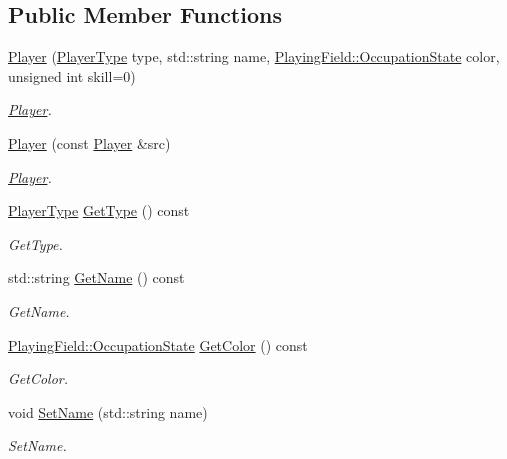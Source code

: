\subsection*{Public Member Functions}
\begin{DoxyCompactItemize}
\item 
\hyperlink{classPlayer_a66f0cbcaa9de5f81fcbb4ee72d0f110e}{Player} (\hyperlink{classPlayer_a97dc3c423902370176605121e8f68415}{Player\-Type} type, std\-::string name, \hyperlink{classPlayingField_ac6df152a3f820aa04a00ab4df4a9d265}{Playing\-Field\-::\-Occupation\-State} color, unsigned int skill=0)
\begin{DoxyCompactList}\small\item\em \hyperlink{classPlayer}{Player}. \end{DoxyCompactList}\item 
\hyperlink{classPlayer_a6d2881f060b07eb48077cad6044fcd8f}{Player} (const \hyperlink{classPlayer}{Player} \&src)
\begin{DoxyCompactList}\small\item\em \hyperlink{classPlayer}{Player}. \end{DoxyCompactList}\item 
\hyperlink{classPlayer_a97dc3c423902370176605121e8f68415}{Player\-Type} \hyperlink{classPlayer_adbb81c3cffe824c9ed8e18f1f635a1a3}{Get\-Type} () const 
\begin{DoxyCompactList}\small\item\em Get\-Type. \end{DoxyCompactList}\item 
std\-::string \hyperlink{classPlayer_aa5030908379dbc95594e4a9856758fef}{Get\-Name} () const 
\begin{DoxyCompactList}\small\item\em Get\-Name. \end{DoxyCompactList}\item 
\hyperlink{classPlayingField_ac6df152a3f820aa04a00ab4df4a9d265}{Playing\-Field\-::\-Occupation\-State} \hyperlink{classPlayer_a49f420e5204c895b9a94f07f6aaf639f}{Get\-Color} () const 
\begin{DoxyCompactList}\small\item\em Get\-Color. \end{DoxyCompactList}\item 
void \hyperlink{classPlayer_ac6727206628d233b9094c8e80f777c1d}{Set\-Name} (std\-::string name)
\begin{DoxyCompactList}\small\item\em Set\-Name. \end{DoxyCompactList}\item 

\end{DoxyCompactItemize}
